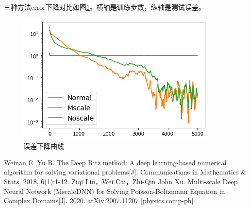 \documentclass[12pt,a4paper]{article}
\begin{document}
三种方法error下降对比如图\ref{error}。横轴是训练步数，纵轴是测试误差。
\begin{figure}[h]
\centering
\includegraphics[width=0.3\linewidth]{error}
\caption{误差下降曲线}
\label{error}
\end{figure}

\begin{thebibliography}{99}  
 Weinan E ,Yu B. The Deep Ritz method: A deep learning-based numerical algorithm for solving variational problems[J]. Communications in Mathematics \& Stats, 2018, 6(1):1-12.
Ziqi Liu，Wei Cai，Zhi-Qin John Xu. Multi-scale Deep Neural Network (MscaleDNN) for Solving Poisson-Boltzmann Equation in Complex Domains[J]. 2020. arXiv:2007.11207 [physics.comp-ph]
\end{thebibliography}
\end{document}
